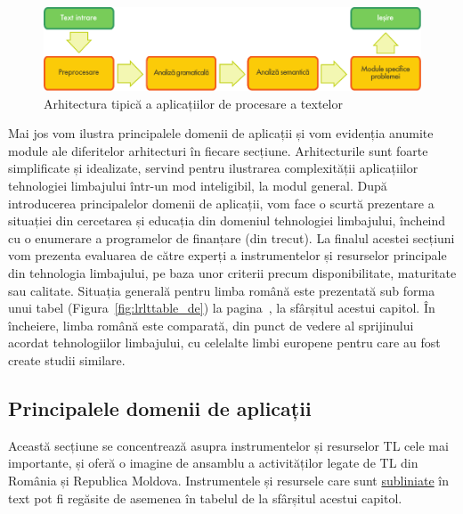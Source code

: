 \documentclass[]{../../metanetpaper}
\begin{document}
\begin{multicols}{2}
\begin{figure}[htb]
\center
\includegraphics[width=\textwidth]{../_media/romanian/text_processing_app_architecture}
\caption{Arhitectura tipică a aplicațiilor de procesare a textelor}
\label{fig:textprocessingarch_de}
\end{figure}

Mai jos vom ilustra principalele domenii de aplicații și vom evidenția anumite module ale diferitelor arhitecturi în fiecare secțiune. Arhitecturile sunt foarte simplificate și idealizate, servind pentru ilustrarea complexității aplicațiilor tehnologiei limbajului într-un mod inteligibil, la modul general. După introducerea principalelor domenii de aplicații, vom face o scurtă prezentare a situației din cercetarea și educația din domeniul tehnologiei limbajului, încheind cu o enumerare a programelor de finanțare (din trecut). La finalul acestei secțiuni vom prezenta evaluarea de către experți a instrumentelor și resurselor principale din tehnologia limbajului, pe baza unor criterii precum disponibilitate, maturitate sau calitate. Situația generală pentru limba română este prezentată sub forma unui tabel (Figura~\ref{fig:lrlttable_de}) la pagina~\pageref{fig:lrlttable_de}, la sfârșitul acestui capitol. În încheiere, limba română este comparată, din punct de vedere al sprijinului acordat tehnologiilor limbajului, cu celelalte limbi europene pentru care au fost create studii similare.

\subsection{Principalele domenii de aplicații} 

Această secțiune se concentrează asupra instrumentelor și resurselor TL cele mai importante, și oferă o imagine de ansamblu a activităților legate de TL din România și Republica Moldova. Instrumentele și resursele care sunt \underline{subliniate} în text pot fi regăsite de asemenea în tabelul de la sfârșitul acestui capitol.

\end{multicols}
\end{document}
